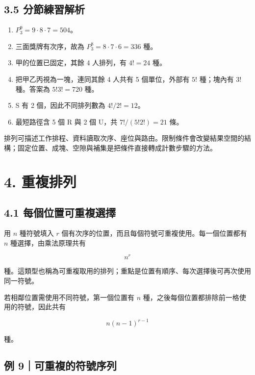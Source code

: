 \documentclass[11pt,a4paper]{article}
\providecommand{\tightlist}{%
  \setlength{\itemsep}{0pt}\setlength{\parskip}{0pt}}
\begin{document}
\subsection{3.5 分節練習解析}\label{ux5206ux7bc0ux7df4ux7fd2ux89e3ux6790-2}

\begin{enumerate}
\def\labelenumi{\arabic{enumi}.}
\tightlist
\item
  \(P^9_3=9\cdot8\cdot7=504\)。
\item
  三面獎牌有次序，故為 \(P^8_3=8\cdot7\cdot6=336\) 種。
\item
  甲的位置已固定，其餘 4 人排列，有 \(4!=24\) 種。
\item
  把甲乙丙視為一塊，連同其餘 4 人共有 5 個單位，外部有 \(5!\) 種；塊內有 \(3!\) 種。答案為 \(5!3!=720\) 種。
\item
  S 有 2 個，因此不同排列數為 \(4!/2!=12\)。
\item
  最短路徑含 5 個 R 與 2 個 U，共 \(7!/(5!2!)=21\) 條。
\end{enumerate}

排列可描述工作排程、資料讀取次序、座位與路由。限制條件會改變結果空間的結構；固定位置、成塊、空隙與補集是把條件直接轉成計數步驟的方法。

\section{4. 重複排列}\label{ux91cdux8907ux6392ux5217}

\subsection{4.1 每個位置可重複選擇}\label{ux6bcfux500bux4f4dux7f6eux53efux91cdux8907ux9078ux64c7}

用 \(n\) 種符號填入 \(r\) 個有次序的位置，而且每個符號可重複使用。每一個位置都有 \(n\) 種選擇，由乘法原理共有

\[
\boxed{n^r}
\]

種。這類型也稱為可重複取用的排列；重點是位置有順序、每次選擇後可再次使用同一符號。

若相鄰位置需使用不同符號，第一個位置有 \(n\) 種，之後每個位置都排除前一格使用的符號，因此共有

\[
n(n-1)^{r-1}
\]

種。

\subsection{例 9｜可重複的符號序列}\label{ux4f8b-9ux53efux91cdux8907ux7684ux7b26ux865fux5e8fux5217}
\end{document}
